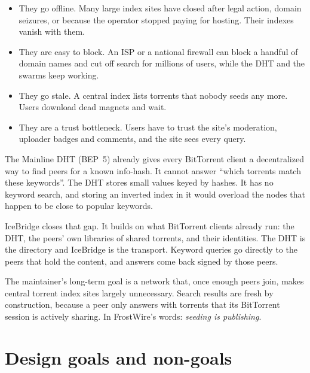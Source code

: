 \documentclass[11pt,a4paper]{article}
\DeclareRobustCommand{\_}{\origunderscore\allowbreak}
\begin{document}
\begin{itemize}
\item They go offline. Many large index sites have closed after legal action, domain
  seizures, or because the operator stopped paying for hosting. Their indexes vanish with them.
\item They are easy to block. An ISP or a national firewall can block a handful of domain
  names and cut off search for millions of users, while the DHT and the swarms keep working.
\item They go stale. A central index lists torrents that nobody seeds any more. Users
  download dead magnets and wait.
\item They are a trust bottleneck. Users have to trust the site's moderation, uploader
  badges and comments, and the site sees every query.
\end{itemize}

The Mainline DHT (BEP~5) already gives every BitTorrent client a decentralized way to find
peers for a known info-hash. It cannot answer ``which torrents match these keywords''. The
DHT stores small values keyed by hashes. It has no keyword search, and storing an inverted
index in it would overload the nodes that happen to be close to popular keywords.

IceBridge closes that gap. It builds on what BitTorrent clients already run: the DHT, the
peers' own libraries of shared torrents, and their identities. The DHT is the directory and
IceBridge is the transport. Keyword queries go directly to the peers that hold the content,
and answers come back signed by those peers.

The maintainer's long-term goal is a network that, once enough peers join, makes central
torrent index sites largely unnecessary. Search results are fresh by construction, because a
peer only answers with torrents that its BitTorrent session is actively sharing. In
FrostWire's words: \emph{seeding is publishing}.

\section{Design goals and non-goals}
\end{document}
